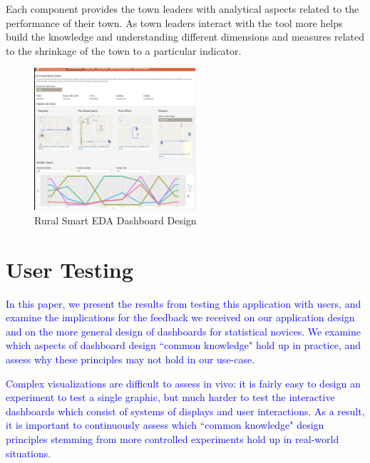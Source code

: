 \documentclass[10pt]{article}\usepackage[]{graphicx}\usepackage[]{color}
\newcommand{\svp}[1]{{\textcolor{blue}{#1}}}
\begin{document}
Each component provides the town leaders with analytical aspects related to the performance of their town. As town leaders interact with the tool more helps build the knowledge and understanding different dimensions and measures related to the shrinkage of the town to a particular indicator.

\begin{figure}[ht!]
\centering
\includegraphics[width=60mm]{SCC_Dashboard_pcp2.png}
\caption{Rural Smart EDA Dashboard Design}
\end{figure}

\section{User Testing}
\svp{In this paper, we present the results from testing this application with users, and examine the implications for the feedback we received on our application design and on the more general design of dashboards for statistical novices. We examine which aspects of dashboard design ``common knowledge" hold up in practice, and assess why these principles may not hold in our use-case.} 

\svp{Complex visualizations are difficult to assess in vivo: it is fairly easy to design an experiment to test a single graphic, but much harder to test the interactive dashboards which consist of systems of displays and user interactions. As a result, it is important to continuously assess which ``common knowledge" design principles stemming from more controlled experiments hold up in real-world situations. }
\end{document}
